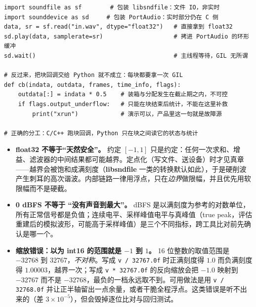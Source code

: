 \documentclass[12pt,a4paper,fontset=fandol]{ctexbook}
\newcommand{\Tp}[1]{\texttt{#1}}
\newcommand{\Lib}[1]{\textbf{#1}}
\begin{document}
\begin{lstlisting}[style=pythonstyle,caption={两种门面的对照：文件级可以交给 Python，回调级不行}]
import soundfile as sf        # 包装 libsndfile：文件 IO，非实时
import sounddevice as sd     # 包装 PortAudio：实时部分仍在 C 侧
data, sr = sf.read("in.wav", dtype="float32")   # 直接拿到 float32
sd.play(data, samplerate=sr)                    # 拷进 PortAudio 的环形缓冲
sd.wait()                                       # 主线程等待，GIL 无所谓

# 反过来，把块回调交给 Python 就不成立：每块都要拿一次 GIL
def cb(indata, outdata, frames, time_info, flags):
    outdata[:] = indata * 0.5    # 装箱与分配发生在截止期之内，不可控
    if flags.output_underflow:   # 只能在块结束后统计，不能在这里补救
        print("xrun")            # 演示可以，产品里这一句就是故障源

# 正确的分工：C/C++ 跑块回调，Python 只在块之间读它的状态与统计
\end{lstlisting}

\begin{note}[title={电平、削波与 int16 缩放}]
\begin{itemize}
\item \textbf{float32 不等于``天然安全''。} 约定 $[-1,1]$ 只是约定：任何一次求和、增益、滤波器的中间结果都可能越界。定点化（写文件、送设备）时才见真章——越界会被饱和成满刻度（\Lib{libsndfile} 一类的转换默认如此），于是硬削波产生刺耳的高次谐波。内部链路一律用浮点，只在\emph{边界}做限幅，并且优先用软限幅而不是硬截。
\item \textbf{0 dBFS 不等于 ``没有声音到最大''。} dBFS 是以满刻度为参考的对数单位，所有正常信号都是负值；连续电平、采样峰值电平与真峰值（true peak，评估重建后的模拟波形，可能高于采样峰值）是三个不同指标，跨工具比对前先确认是哪一个。
\item \textbf{缩放错误：以为 int16 的范围就是 $-1$ 到 $1$。} 16 位整数的取值范围是 $-32768$ 到 $32767$，\emph{不对称}。写成 \Tp{v / 32767.0f} 时正满刻度得 $1.0$ 而负满刻度得 $1.00003$，越界一次；写成 \Tp{v * 32767.0f} 的反向缩放会把 $-1.0$ 映射到 $-32767$ 而不是 $-32768$，最负的一档永远取不到。可用做法是用 \Tp{v / 32768.0f} 并让正半轴留出一点余量，或者干脆全程浮点。这类错误是听不出来的（差 $3\times 10^{-5}$），但会毁掉逐位比对与回归测试。
\end{itemize}
\end{note}
\end{document}
